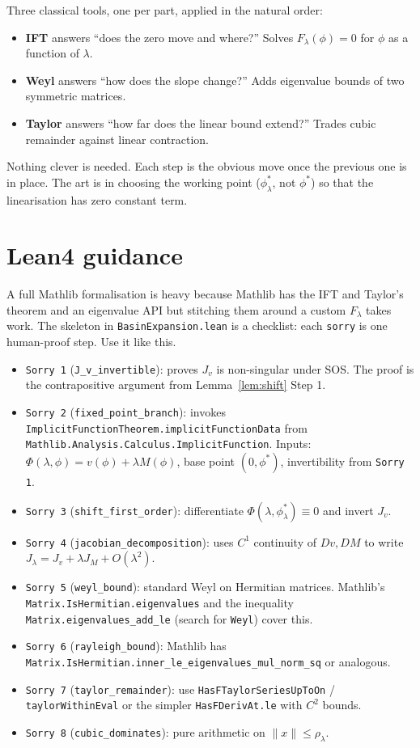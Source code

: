 \documentclass[11pt]{article}
\begin{document}
Three classical tools, one per part, applied in the natural order:

\begin{itemize}
\item \textbf{IFT} answers ``does the zero move and where?'' Solves $F_\lambda(\phi) = 0$ for $\phi$ as a function of $\lambda$.
\item \textbf{Weyl} answers ``how does the slope change?'' Adds eigenvalue bounds of two symmetric matrices.
\item \textbf{Taylor} answers ``how far does the linear bound extend?'' Trades cubic remainder against linear contraction.
\end{itemize}

Nothing clever is needed. Each step is the obvious move once the previous one is in place. The art is in choosing the working point ($\phi^*_\lambda$, not $\phi^*$) so that the linearisation has zero constant term.

\section{Lean4 guidance}\label{sec:lean}

A full Mathlib formalisation is heavy because Mathlib has the IFT and Taylor's theorem and an eigenvalue API but stitching them around a custom $F_\lambda$ takes work. The skeleton in \texttt{BasinExpansion.lean} is a checklist: each \texttt{sorry} is one human-proof step. Use it like this.

\begin{itemize}
\item \texttt{Sorry 1} (\verb|J_v_invertible|): proves $J_v$ is non-singular under SOS. The proof is the contrapositive argument from Lemma~\ref{lem:shift} Step 1.
\item \texttt{Sorry 2} (\verb|fixed_point_branch|): invokes \verb|ImplicitFunctionTheorem.implicitFunctionData| from \verb|Mathlib.Analysis.Calculus.ImplicitFunction|. Inputs: $\Phi(\lambda,\phi) = v(\phi) + \lambda M(\phi)$, base point $(0, \phi^*)$, invertibility from \texttt{Sorry 1}.
\item \texttt{Sorry 3} (\verb|shift_first_order|): differentiate $\Phi(\lambda, \phi^*_\lambda) \equiv 0$ and invert $J_v$.
\item \texttt{Sorry 4} (\verb|jacobian_decomposition|): uses $C^1$ continuity of $Dv, DM$ to write $J_\lambda = J_v + \lambda J_M + O(\lambda^2)$.
\item \texttt{Sorry 5} (\verb|weyl_bound|): standard Weyl on Hermitian matrices. Mathlib's \verb|Matrix.IsHermitian.eigenvalues| and the inequality \verb|Matrix.eigenvalues_add_le| (search for \verb|Weyl|) cover this.
\item \texttt{Sorry 6} (\verb|rayleigh_bound|): Mathlib has \verb|Matrix.IsHermitian.inner_le_eigenvalues_mul_norm_sq| or analogous.
\item \texttt{Sorry 7} (\verb|taylor_remainder|): use \verb|HasFTaylorSeriesUpToOn| / \verb|taylorWithinEval| or the simpler \verb|HasFDerivAt.le| with $C^2$ bounds.
\item \texttt{Sorry 8} (\verb|cubic_dominates|): pure arithmetic on $\|x\| \le \rho_\lambda$.
\end{itemize}
\end{document}
